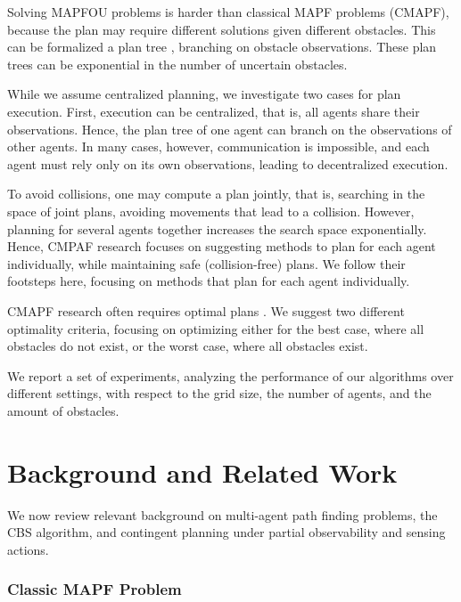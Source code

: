 \documentclass[letterpaper]{article} %
\begin{document}
Solving MAPFOU problems is harder than classical MAPF problems (CMAPF), because the plan may require different solutions given different obstacles. This can be formalized a  plan tree \cite{hoffmann2005contingent}, branching on obstacle observations. These plan trees can be exponential in the number of uncertain obstacles. 

While we assume centralized planning, we investigate two cases for plan execution. First, execution can be centralized, that is, all agents share their observations. Hence, the plan tree of one agent can branch on the observations of other agents. In many cases, however, communication is impossible, and each agent must rely only on its own observations, leading to decentralized execution.

To avoid collisions, one may compute a plan jointly, that is, searching in the space of joint plans, avoiding movements that lead to a collision. However, planning for several agents together increases the search space exponentially. Hence, CMPAF research focuses on suggesting methods to plan for each agent individually, while maintaining safe (collision-free) plans. We follow their footsteps here, focusing on methods that plan for each agent individually.

CMAPF research often requires optimal plans \cite{stern2019multi}. We suggest two different optimality criteria, focusing on optimizing either for the best case, where all obstacles do not exist, or the worst case, where all obstacles exist. 

We report a set of experiments, analyzing the performance of our algorithms over different settings, with respect to the grid size, the number of agents, and the amount of obstacles.





\section{Background and Related Work}

We now review relevant background on multi-agent path finding problems, the CBS algorithm, and contingent planning under partial observability and sensing actions.




\subsubsection{Classic MAPF Problem}
\end{document}
